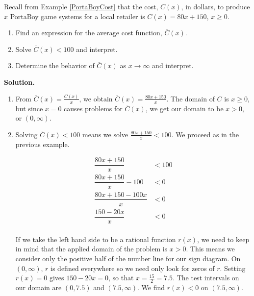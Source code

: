 \begin{ex} \label{averagecostapp} Recall from Example \ref {PortaBoyCost} that the cost,  $C(x)$, in dollars, to produce $x$ PortaBoy game systems for a local retailer is $C(x) = 80x + 150$, $x \geq 0$.

\begin{enumerate}

\item  Find an expression for the average cost function, $\overline{C}(x)$. 

\item  \label{costlessthan} Solve $\overline{C}(x) < 100$ and interpret.

\item  Determine the behavior of $\overline{C}(x)$ as $x \rightarrow \infty$ and interpret.


\end{enumerate}

{\bf Solution.}

\begin{enumerate}

\item  From $\overline{C}(x) = \frac{C(x)}{x}$, we obtain $\overline{C}(x) = \frac{80x+150}{x}$.  The domain of $C$ is $x \geq 0$, but since $x=0$ causes problems for $\overline{C}(x)$, we get our domain to be $x>0$, or $(0, \infty)$.

\item  Solving $\overline{C}(x) < 100$ means we solve $\frac{80x+150}{x} < 100$.  We proceed as in the previous example.

\begin{align*}
\dfrac{80x+150}{x} & < 100 \\
\dfrac{80x+150}{x} - 100 & < 0 \\
\dfrac{80x + 150 - 100x}{x} & < 0 \tag{common denominator} \\
\dfrac{150 - 20x}{x} & < 0 \\
\end{align*}

If we take the left hand side to be a rational function $r(x)$, we need to keep in mind that the applied domain of the problem is $x > 0$.  This means we consider only the positive half of the number line for our sign diagram.  On $(0, \infty)$, $r$ is defined everywhere so we need only look for zeros of $r$.  Setting $r(x)=0$ gives $150-20x =0$, so that $x = \frac{15}{2}= 7.5$.  The test intervals on our domain are $(0, 7.5)$ and $(7.5, \infty)$.  We find $r(x) < 0$ on $(7.5, \infty)$.


\end{enumerate}
\end{ex}
